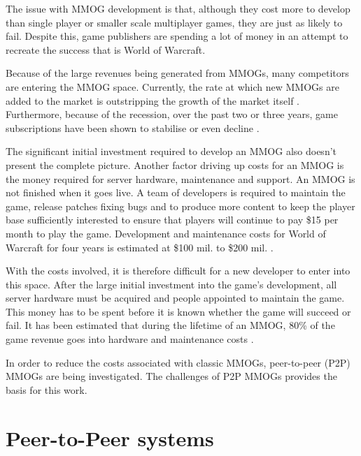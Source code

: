 The issue with MMOG development is that, although they cost more to develop than single player or smaller scale multiplayer games, they are just as likely to fail. Despite this, game publishers are spending a lot of money in an attempt to recreate the success that is World of Warcraft.

Because of the large revenues being generated from MMOGs, many competitors are entering the MMOG space. Currently, the rate at which new MMOGs are added to the market is outstripping the growth of the market itself \cite{newzoo_mmo_report}. Furthermore, because of the recession, over the past two or three years, game subscriptions have been shown to stabilise or even decline \cite{mmo_growth_chart}.

The significant initial investment required to develop an MMOG also doesn't present the complete picture. Another factor driving up costs for an MMOG is the money required for server hardware, maintenance and support. An MMOG is not finished when it goes live. A team of developers is required to maintain the game, release patches fixing bugs and to produce more content to keep the player base sufficiently interested to ensure that players will continue to pay \$15 per month to play the game. Development and maintenance costs for World of Warcraft for four years is estimated at \$100 mil. to \$200 mil. \cite{wow_cost}.

With the costs involved, it is therefore difficult for a new developer to enter into this space. After the large initial investment into the game's development, all server hardware must be acquired and people appointed to maintain the game. This money has to be spent before it is known whether the game will succeed or fail. It has been estimated that during the lifetime of an MMOG, 80\% of the game revenue goes into hardware and maintenance costs \cite{cs_mmog_cost}.

In order to reduce the costs associated with classic MMOGs, peer-to-peer (P2P) MMOGs are being investigated. The challenges of P2P MMOGs provides the basis for this work.

\section{Peer-to-Peer systems}

